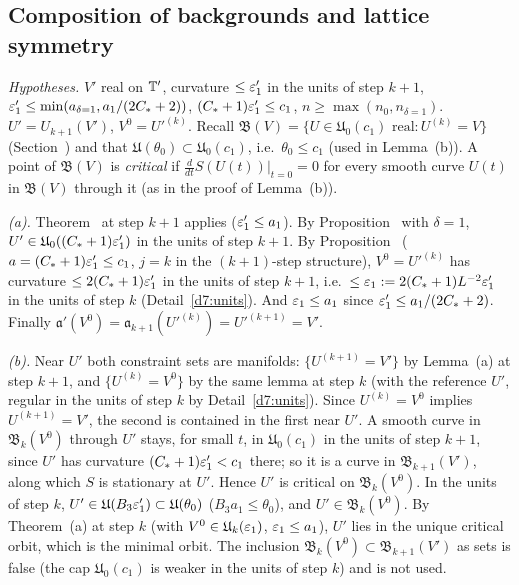 \subsection{Composition of backgrounds and lattice symmetry}\label{d7:comp-sec}

\begin{detail}\label{d7:composition}
\emph{Hypotheses.} $V'$ real on $\mathbb T'$, curvature $\le\varepsilon'_1$ in the units of step $k+1$, $\varepsilon'_1\le\min(a_{\delta=1},a_1/(2C_*+2))$, $(C_*+1)\varepsilon'_1\le c_1$, $n\ge\max(n_0,n_{\delta=1})$. $U'=U_{k+1}(V')$, $V^0=U'^{(k)}$. Recall $\mathfrak B(V)=\{U\in\mathfrak U_0(c_1)\text{ real}: U^{(k)}=V\}$ (Section~) and that $\mathfrak U(\theta_0)\subset\mathfrak U_0(c_1)$, i.e.\ $\theta_0\le c_1$ (used in Lemma~(b)). A point of $\mathfrak B(V)$ is \emph{critical} if $\frac d{dt}S(U(t))|_{t=0}=0$ for every smooth curve $U(t)$ in $\mathfrak B(V)$ through it (as in the proof of Lemma~(b)).
\begin{step}
\emph{(a).} Theorem~ at step $k+1$ applies ($\varepsilon'_1\le a_1$). By Proposition~ with $\delta=1$, $U'\in\mathfrak U_0((C_*+1)\varepsilon'_1)$ in the units of step $k+1$. By Proposition~ ($a=(C_*+1)\varepsilon'_1\le c_1$, $j=k$ in the $(k+1)$-step structure), $V^0=U'^{(k)}$ has curvature $\le2(C_*+1)\varepsilon'_1$ in the units of step $k+1$, i.e.\ $\le\varepsilon_1:=2(C_*+1)L^{-2}\varepsilon'_1$ in the units of step $k$ (Detail~\ref{d7:units}). And $\varepsilon_1\le a_1$ since $\varepsilon'_1\le a_1/(2C_*+2)$. Finally $\mathfrak a'(V^0)=\mathfrak a_{k+1}(U'^{(k)})=U'^{(k+1)}=V'$.
\end{step}
\begin{step}
\emph{(b).} Near $U'$ both constraint sets are manifolds: $\{U^{(k+1)}=V'\}$ by Lemma~(a) at step $k+1$, and $\{U^{(k)}=V^0\}$ by the same lemma at step $k$ (with the reference $U'$, regular in the units of step $k$ by Detail~\ref{d7:units}). Since $U^{(k)}=V^0$ implies $U^{(k+1)}=V'$, the second is contained in the first near $U'$. A smooth curve in $\mathfrak B_k(V^0)$ through $U'$ stays, for small $t$, in $\mathfrak U_0(c_1)$ in the units of step $k+1$, since $U'$ has curvature $(C_*+1)\varepsilon'_1<c_1$ there; so it is a curve in $\mathfrak B_{k+1}(V')$, along which $S$ is stationary at $U'$. Hence $U'$ is critical on $\mathfrak B_k(V^0)$. In the units of step $k$, $U'\in\mathfrak U(B_3\varepsilon'_1)\subset\mathfrak U(\theta_0)$ ($B_3a_1\le\theta_0$), and $U'\in\mathfrak B_k(V^0)$. By Theorem~(a) at step $k$ (with $V^0\in\mathfrak U_k(\varepsilon_1)$, $\varepsilon_1\le a_1$), $U'$ lies in the unique critical orbit, which is the minimal orbit. The inclusion $\mathfrak B_k(V^0)\subset\mathfrak B_{k+1}(V')$ as sets is false (the cap $\mathfrak U_0(c_1)$ is weaker in the units of step $k$) and is not used.

\end{step}
\end{detail}
